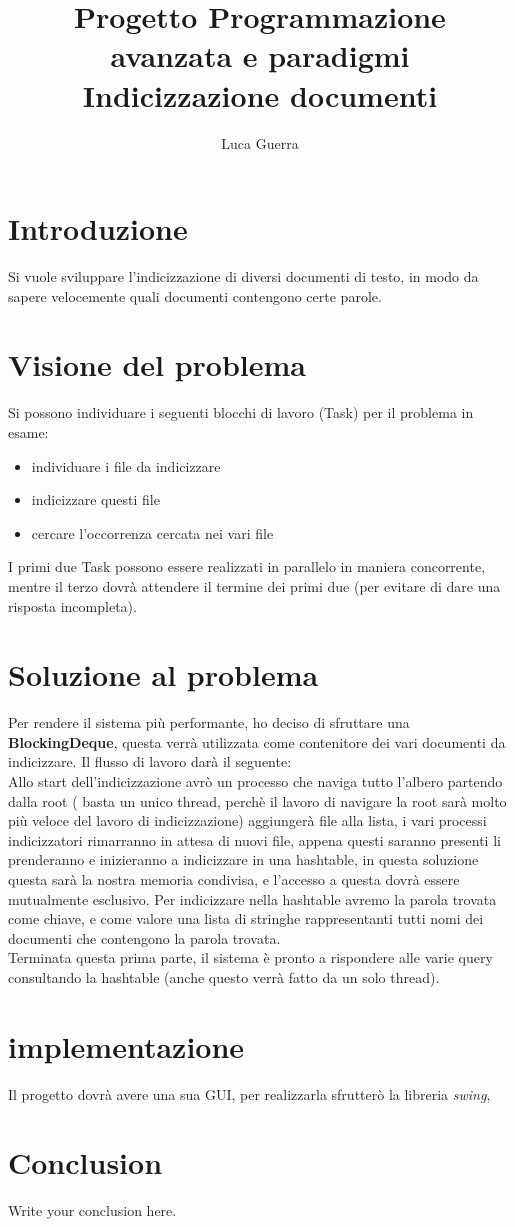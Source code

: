 \documentclass{article}
\begin{document}
\title{Progetto Programmazione avanzata e paradigmi \\ Indicizzazione documenti}

\author{Luca Guerra}

\maketitle

\section{Introduzione}
Si vuole sviluppare l'indicizzazione di diversi documenti di testo, in modo da sapere velocemente quali documenti contengono certe parole.

\section{Visione del problema}
Si possono individuare i seguenti blocchi di lavoro (Task) per il problema in esame:
\begin{itemize}
  \item individuare i file da indicizzare
  \item indicizzare questi file
  \item cercare l'occorrenza cercata nei vari file
\end{itemize} 
I primi due Task possono essere realizzati in parallelo in maniera concorrente, mentre il terzo dovrà attendere il termine dei primi due (per evitare di dare una risposta incompleta).

\section{Soluzione al problema}

Per rendere il sistema più performante, ho deciso di sfruttare una \textbf{BlockingDeque}, questa verrà utilizzata come contenitore dei vari documenti da indicizzare. Il flusso di lavoro darà il seguente: \\
Allo start dell'indicizzazione avrò un processo che naviga tutto l'albero partendo dalla root ( basta un unico thread, perchè il lavoro di navigare la root sarà molto più veloce del lavoro di indicizzazione) aggiungerà file alla lista, i vari processi indicizzatori rimarranno in attesa di nuovi file, appena questi saranno presenti li prenderanno e inizieranno a indicizzare in una hashtable, in questa soluzione questa sarà la nostra memoria condivisa, e l'accesso a questa dovrà essere mutualmente esclusivo.
Per indicizzare nella hashtable avremo la parola trovata come chiave, e come valore una lista di stringhe rappresentanti tutti nomi dei documenti che contengono la parola trovata.\\
Terminata questa prima parte, il sistema è pronto a rispondere alle varie query consultando la hashtable (anche questo verrà fatto da un solo thread).

\section{implementazione}


Il progetto dovrà avere una sua GUI, per realizzarla sfrutterò la libreria \textit{swing}, 
\section{Conclusion}
Write your conclusion here.
\end{document}
